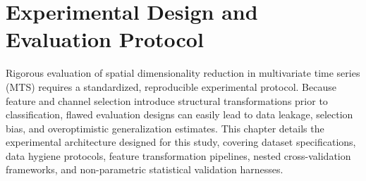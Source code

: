 \chapter{Experimental Design and Evaluation Protocol}
\label{chap:experimental_design}

\noindent
Rigorous evaluation of spatial dimensionality reduction in multivariate time series (MTS) requires a standardized, reproducible experimental protocol. Because feature and channel selection introduce structural transformations prior to classification, flawed evaluation designs can easily lead to data leakage, selection bias, and overoptimistic generalization estimates. This chapter details the experimental architecture designed for this study, covering dataset specifications, data hygiene protocols, feature transformation pipelines, nested cross-validation frameworks, and non-parametric statistical validation harnesses.
